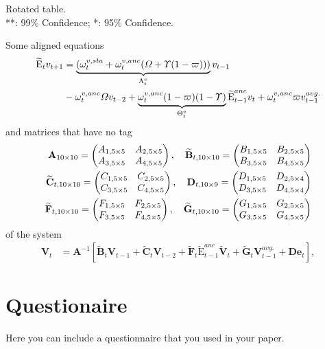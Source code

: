 \documentclass[11pt,a4paper]{article}
\begin{document}
\begin{appendix}
\begin{table}
	\caption[Rotated table]{Rotated table. \\ **: 99\% Confidence; *: 95\% Confidence.}
\end{table}
Some aligned equations
	\begin{align}
	\widetilde{\text{E}}_tv_{t+1}&= \underbrace{(\omega_t^{v,sta}+\omega_t^{v,anc}(\varOmega+\varUpsilon(1-\varpi)))}_{\Lambda^v_t}v_{t-1} \notag \\&-\omega_t^{v,anc}\varOmega v_{t-2}+\underbrace{\omega_t^{v,anc}(1-\varpi)(1-\varUpsilon)}_{\Theta^v_t}\widetilde{\text{E}}^{anc}_{t-1}v_{t}+\omega_t^{v,anc}\varpi v^{avg.}_{t-1}
	\end{align}
	and matrices that have no tag 
	\begin{align}
	\textbf{A}_{10\times10}= \begin{pmatrix}
	A_{1,5\times5} & A_{2,5\times5} \\
	A_{3,5\times5} & A_{4,5\times5}
	\end{pmatrix}, \quad \widetilde{\textbf{B}}_{t,10\times10}= \begin{pmatrix}
	B_{1,5\times5} & B_{2,5\times5} \\
	B_{3,5\times5} & B_{4,5\times5}
	\end{pmatrix}\notag \\ \widetilde{\textbf{C}}_{t,10\times10}=\begin{pmatrix}
	C_{1,5\times5} & C_{2,5\times5} \\
	C_{3,5\times5} & C_{4,5\times5}
	\end{pmatrix}, \quad \textbf{D}_{t,10\times9}= \begin{pmatrix}
	D_{1,5\times5} & D_{2,5\times4} \\
	D_{3,5\times5} & D_{4,5\times4}
	\end{pmatrix}\notag \\
	\widetilde{\textbf{F}}_{t,10\times10}=\begin{pmatrix}
	F_{1,5\times5} & F_{2,5\times5} \\
	F_{3,5\times5} & F_{4,5\times5}
	\end{pmatrix}, \quad 	\widetilde{\textbf{G}}_{t,10\times10}= \begin{pmatrix}
	G_{1,5\times5} & G_{2,5\times5} \\
	G_{3,5\times5} & G_{4,5\times5}
	\end{pmatrix}\notag 
	\end{align}
	of the system 
   \begin{align}
   \textbf{V}_t &= \textbf{A}^{-1}\left[\widetilde{\textbf{B}}_t\textbf{V}_{t-1}+\widetilde{\textbf{C}}_t\textbf{V}_{t-2}+\widetilde{\textbf{F}}_t\widetilde{\text{E}}^{anc}_{t-1}\widetilde{\textbf{V}}_{t}+\widetilde{\textbf{G}}_t\textbf{V}^{avg.}_{t-1}+\textbf{D}\textbf{e}_t\right],
   \end{align}
   \newpage
	\section{Questionaire}
	Here you can include a questionnaire that you used in your paper.
\end{appendix}
\newpage
\end{document}
